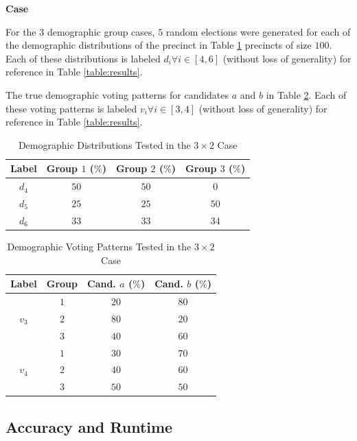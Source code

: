 \documentclass[fleqn,10pt]{style}
\begin{document}
 \textbf{Case}

For the $3$ demographic group cases, $5$ random elections were generated for each of the demographic distributions of the precinct in Table \ref{table:demo_dist_3} precincts of size $100$. Each of these distributions is labeled $d_i \forall i \in [4, 6]$ (without loss of generality) for reference in Table \ref{table:results}.

The true demographic voting patterns for candidates $a$ and $b$ in Table \ref{table:voting_3}. Each of these voting patterns is labeled $v_i \forall i \in [3, 4]$ (without loss of generality) for reference in Table \ref{table:results}.

\begin{table}[ht]
 \centering
 \caption{Demographic Distributions Tested in the $3 \times 2$ Case}
 \label{table:demo_dist_3}
 \begin{tabular}{|c|c|c|c|}
   \hline
   Label & Group $1$ ($\%$) & Group $2$ ($\%$) & Group $3$ ($\%$) \\
   \hline
   $d_4$ & $50$ & $50$ & $0$ \\
   $d_5$ & $25$ & $25$ & $50$ \\
   $d_6$ & $33$ & $33$ & $34$ \\
  \hline
 \end{tabular}
\end{table}

\begin{table}[ht]
 \centering
 \caption{Demographic Voting Patterns Tested in the $3 \times 2$ Case}
 \label{table:voting_3}
 \begin{tabular}{|c|c|c|c|}
   \hline
   Label & Group & Cand. $a$ ($\%$) & Cand. $b$ ($\%$) \\
   \hline
   \multirow{3}{*}{$v_3$} & $1$ & $20$ & $80$ \\
   & $2$ & $80$ & $20$ \\
   & $3$ & $40$ & $60$ \\
   \hline
   \multirow{3}{*}{$v_4$} & $1$ & $30$ & $70$ \\
   & $2$ & $40$ & $60$ \\
   & $3$ & $50$ & $50$ \\
  \hline
 \end{tabular}
\end{table}

\subsection{Accuracy and Runtime}
\end{document}
